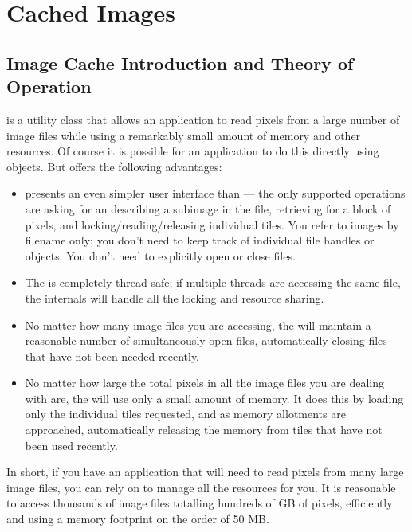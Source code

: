 \chapter{Cached Images}
\label{chap:imagecache}

\section{Image Cache Introduction and Theory of Operation}
\label{sec:imagecache:intro}

\ImageCache is a utility class that allows an application to read pixels
from a large number of image files while using a remarkably small amount
of memory and other resources.  Of course it is possible for an
application to do this directly using \ImageInput objects.  But
\ImageCache offers the following advantages:

\begin{itemize}
\item \ImageCache presents an even simpler user interface than
  \ImageInput --- the only supported operations are asking for an
  \ImageSpec describing a subimage in the file, retrieving for a block
  of pixels, and locking/reading/releasing individual tiles.  You refer
  to images by filename only; you don't need to keep track of individual
  file handles or \ImageInput objects.  You don't need to explicitly
  open or close files.

\item The \ImageCache is completely thread-safe; if multiple threads
  are accessing the same file, the \ImageCache internals will handle
  all the locking and resource sharing.

\item No matter how many image files you are accessing, the \ImageCache
  will maintain a reasonable number of simultaneously-open files,
  automatically closing files that have not been needed recently.

\item No matter how large the total pixels in all the image files you
  are dealing with are, the \ImageCache will use only a small amount of
  memory.  It does this by loading only the individual tiles requested,
  and as memory allotments are approached, automatically releasing the
  memory from tiles that have not been used recently.
\end{itemize}

In short, if you have an application that will need to read pixels from
many large image files, you can rely on \ImageCache to manage all the
resources for you.  It is reasonable to access thousands of image files
totalling hundreds of GB of pixels, efficiently and using a memory
footprint on the order of 50 MB.

